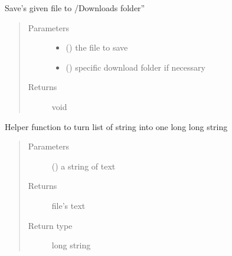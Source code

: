 \documentclass[letterpaper,10pt,english]{sphinxmanual}
\begin{document}

\begin{fulllineitems}
\label{\detokenize{functionsv1:common_functions.savefile}}
Save’s given file to /Downloads folder”
\begin{quote}\begin{description}
\item[{Parameters}] \leavevmode\begin{itemize}
\item {} 
 () \textendash{} the file to save

\item {} 
 () \textendash{} specific download folder if necessary

\end{itemize}

\item[{Returns}] \leavevmode
void

\end{description}\end{quote}

\end{fulllineitems}


\begin{fulllineitems}
\label{\detokenize{functionsv1:common_functions.stringlisttolonglongstring}}
Helper function to turn list of string into one long long string
\begin{quote}\begin{description}
\item[{Parameters}] \leavevmode
{} (\sphinxstyleliteralemphasis{{[}}\sphinxstyleliteralemphasis{{]}}) \textendash{} a string of text

\item[{Returns}] \leavevmode
file’s text

\item[{Return type}] \leavevmode
long string

\end{description}\end{quote}

\end{fulllineitems}
\end{document}
